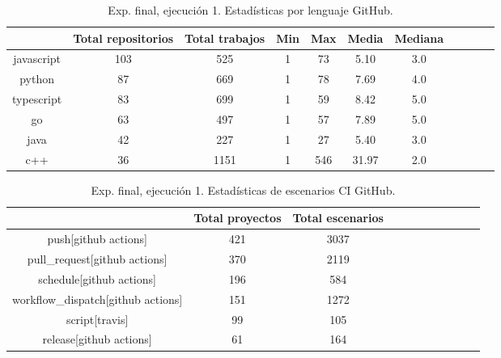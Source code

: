 \begin{table}
  \centering
  \caption{Exp. final, ejecución 1. Estadísticas por lenguaje GitHub.}
  \label{tab:tabla_f1_4}

\begin{footnotesize}
\renewcommand{\arraystretch}{1.5} %
\begin{tabular}{ccccccccccc}
  \hline
  {} &  Total repositorios &  Total trabajos &  Min &  Max &  Media &  Mediana \\
  \hline
  javascript       &        103 &         525 &    1 &   73 &   5.10 &      3.0 \\
  python           &         87 &         669 &    1 &   78 &   7.69 &      4.0 \\
  typescript       &         83 &         699 &    1 &   59 &   8.42 &      5.0 \\
  go               &         63 &         497 &    1 &   57 &   7.89 &      5.0 \\
  java             &         42 &         227 &    1 &   27 &   5.40 &      3.0 \\
  c++              &         36 &        1151 &    1 &  546 &  31.97 &      2.0 \\
 \end{tabular}
\end{footnotesize}

\end{table}

\begin{table}
  \centering
  \caption{Exp. final, ejecución 1. Estadísticas de escenarios CI GitHub.}
  \label{tab:tabla_f1_5}

\begin{footnotesize}
\renewcommand{\arraystretch}{1.5} %
\begin{tabular}{ccccccccccc}
  \hline
  {} &  Total proyectos &  Total escenarios \\
  \hline
  push[github actions]                        &                 421 &          3037 \\
  pull\_request[github actions]                &                 370 &          2119 \\
  schedule[github actions]                    &                 196 &           584 \\
  workflow\_dispatch[github actions]           &                 151 &          1272 \\
  script[travis]                              &                  99 &           105 \\
  release[github actions]                     &                  61 &           164 \\
 \end{tabular}
\end{footnotesize}

\end{table}

